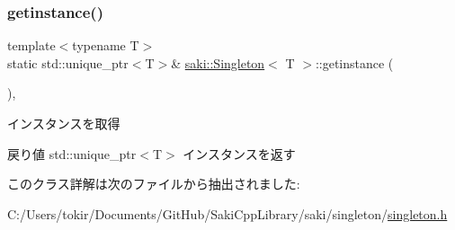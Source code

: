 \subsubsection{\texorpdfstring{getinstance()}{getinstance()}}
{\footnotesize\ttfamily template$<$typename T$>$ \\
static std\+::unique\+\_\+ptr$<$T$>$\& \mbox{\hyperlink{classsaki_1_1_singleton}{saki\+::\+Singleton}}$<$ T $>$\+::getinstance (\begin{DoxyParamCaption}{ }\end{DoxyParamCaption})\hspace{0.3cm}{\ttfamily [inline]}, {\ttfamily [static]}}



インスタンスを取得 

\begin{DoxyReturn}{戻り値}
std\+::unique\+\_\+ptr$<$\+T$>$ インスタンスを返す 
\end{DoxyReturn}


このクラス詳解は次のファイルから抽出されました\+:\begin{DoxyCompactItemize}
\item 
C\+:/\+Users/tokir/\+Documents/\+Git\+Hub/\+Saki\+Cpp\+Library/saki/singleton/\mbox{\hyperlink{singleton_8h}{singleton.\+h}}\end{DoxyCompactItemize}
